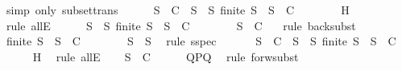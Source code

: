 \begin{isabellebody}
\ {\isacharparenleft}simp\ only{\isacharcolon}\ subset{\isacharunderscore}trans{\isacharparenright}\isanewline
\ \ \ \ \isamarkupfalse%
\ {}{\isacharcolon}{\isachardoublequoteopen}S\ {\isasymin}\ C\ {\isasymlongleftrightarrow}\ {\isacharparenleft}{\isasymforall}S{\isacharprime}\ {\isasymsubseteq}\ S{\isachardot}\ finite\ S{\isacharprime}\ {\isasymlongrightarrow}\ S{\isacharprime}\ {\isasymin}\ C{\isacharparenright}{\isachardoublequoteclose}\isanewline
\ \ \ \ \ \ \isamarkupfalse%
\ H\ \isamarkupfalse%
\ {\isacharparenleft}rule\ allE{\isacharparenright}\isanewline
\ \ \ \ \isamarkupfalse%
\ {\isachardoublequoteopen}{\isasymforall}S{\isacharprime}\ {\isasymsubseteq}\ S{\isachardot}\ finite\ S{\isacharprime}\ {\isasymlongrightarrow}\ S{\isacharprime}\ {\isasymin}\ C{\isachardoublequoteclose}\isanewline
\ \ \ \ \ \ \isamarkupfalse%
\ {\isacartoucheopen}S\ {\isasymin}\ C{\isacartoucheclose}\ {}\ \isamarkupfalse%
\ {\isacharparenleft}rule\ back{\isacharunderscore}subst{\isacharparenright}\isanewline
\ \ \ \ \isamarkupfalse%
\ {\isachardoublequoteopen}finite\ S{\isacharprime}{\isacharprime}\ {\isasymlongrightarrow}\ S{\isacharprime}{\isacharprime}\ {\isasymin}\ C{\isachardoublequoteclose}\isanewline
\ \ \ \ \ \ \isamarkupfalse%
\ {\isacartoucheopen}S{\isacharprime}{\isacharprime}\ {\isasymsubseteq}\ S{\isacartoucheclose}\ \isamarkupfalse%
\ {\isacharparenleft}rule\ sspec{\isacharparenright}\isanewline
\ \ \isamarkupfalse%
\isanewline
\ \ \isamarkupfalse%
\ {\isachardoublequoteopen}S{\isacharprime}\ {\isasymin}\ C\ {\isasymlongleftrightarrow}\ {\isacharparenleft}{\isasymforall}S{\isacharprime}{\isacharprime}\ {\isasymsubseteq}\ S{\isacharprime}{\isachardot}\ finite\ S{\isacharprime}{\isacharprime}\ {\isasymlongrightarrow}\ S{\isacharprime}{\isacharprime}\ {\isasymin}\ C{\isacharparenright}{\isachardoublequoteclose}\isanewline
\ \ \ \ \isamarkupfalse%
\ H\ \isamarkupfalse%
\ {\isacharparenleft}rule\ allE{\isacharparenright}\isanewline
\ \ \isamarkupfalse%
\ {\isachardoublequoteopen}S{\isacharprime}\ {\isasymin}\ C{\isachardoublequoteclose}\isanewline
\ \ \ \ \isamarkupfalse%
\ QPQ\ \isamarkupfalse%
\ {\isacharparenleft}rule\ forw{\isacharunderscore}subst{\isacharparenright}\isanewline
{}\isamarkupfalse%
%
\endisatagproof
{\isafoldproof}%
%
\isadelimproof
%
\endisadelimproof

\end{isabellebody}
